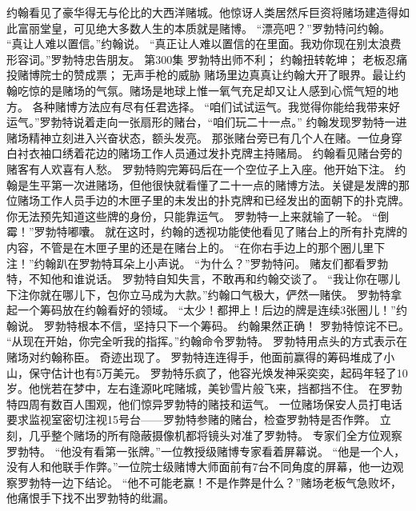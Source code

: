 \documentclass[a4paper,12pt,UTF8,twoside]{ctexbook}
\begin{document}
        约翰看见了豪华得无与伦比的大西洋赌城。他惊讶人类居然斥巨资将赌场建造得如此富丽堂皇，可见绝大多数人生的本质就是赌博。  
        “漂亮吧？”罗勃特问约翰。        
      “真让人难以置信。”约翰说。  
        “真正让人难以置信的在里面。我劝你现在别太浪费形容词。”罗勃特忠告朋友。          第300集  
        罗勃特出师不利；  
        约翰扭转乾坤；  
        老板忍痛投赌博院士的赞成票；  
        无声手枪的威胁    
        赌场里边真真让约翰大开了眼界。最让约翰吃惊的是赌场的气氛。赌场是地球上惟一氧气充足却又让人感到心慌气短的地方。  
        各种赌博方法应有尽有任君选择。  
        “咱们试试运气。我觉得你能给我带来好运气。”罗勃特说着走向一张扇形的赌台，“咱们玩二十一点。”  
        约翰发现罗勃特一进赌场精神立刻进入兴奋状态，额头发亮。  
        那张赌台旁已有几个人在赌。一位身穿白衬衣袖口绣着花边的赌场工作人员通过发扑克牌主持赌局。  
        约翰看见赌台旁的赌客有人欢喜有人愁。  
        罗勃特购完筹码后在一个空位子上入座。他开始下注。  
        约翰是生平第一次进赌场，但他很快就看懂了二十一点的赌博方法。关键是发牌的那位赌场工作人员手边的木匣子里的未发出的扑克牌和已经发出的面朝下的扑克牌。你无法预先知道这些牌的身份，只能靠运气。  
        罗勃特一上来就输了一轮。  
        “倒霉！”罗勃特嘟囔。  
        就在这时，约翰的透视功能使他看见了赌台上的所有扑克牌的内容，不管是在木匣子里的还是在赌台上的。  
        “在你右手边上的那个圈儿里下注！”约翰趴在罗勃特耳朵上小声说。  
        “为什么？”罗勃特问。  
        赌友们都看罗勃特，不知他和谁说话。  
        罗勃特自知失言，不敢再和约翰交谈了。  
        “我让你在哪儿下注你就在哪儿下，包你立马成为大款。”约翰口气极大，俨然一赌侠。  
        罗勃特拿起一个筹码放在约翰看好的领域。  
        “太少！都押上！后边的牌是连续3张圈儿！”约翰说。        
        罗勃特根本不信，坚持只下一个筹码。  
        约翰果然正确！  
        罗勃特惊诧不已。  
        “从现在开始，你完全听我的指挥。”约翰命令罗勃特。  
        罗勃特用点头的方式表示在赌场对约翰称臣。  
        奇迹出现了。  
        罗勃特连连得手，他面前赢得的筹码堆成了小山，保守估计也有5万美元。  
        罗勃特乐疯了，他容光焕发神采奕奕，起码年轻了10岁。他恍若在梦中，左右逢源叱咤赌城，美钞雪片般飞来，挡都挡不住。  
        在罗勃特四周有数百人围观，他们惊异罗勃特的赌技和运气。  
        一位赌场保安人员打电话要求监视室密切注视15号台——罗勃特参赌的赌台，检查罗勃特是否作弊。  
        立刻，几乎整个赌场的所有隐蔽摄像机都将镜头对准了罗勃特。  
        专家们全方位观察罗勃特。  
        “他没有看第一张牌。”一位教授级赌博专家看着屏幕说。  
        “他是一个人，没有人和他联手作弊。”一位院士级赌博大师面前有7台不同角度的屏幕，他一边观察罗勃特一边下结论。  
        “他不可能老赢！不是作弊是什么？”赌场老板气急败坏，他痛恨手下找不出罗勃特的纰漏。  
\end{document}
